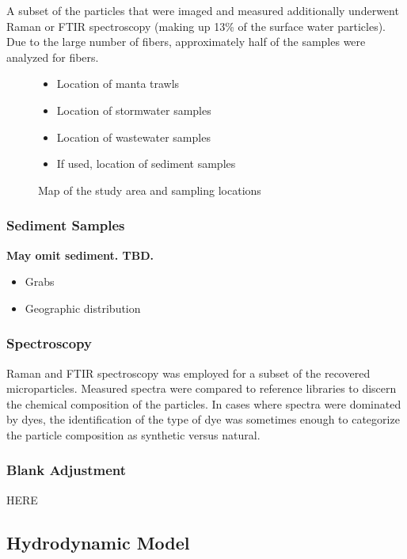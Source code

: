 \documentclass[draft]{jgr/agujournal2019}
\begin{document}
A subset of the particles that were imaged and measured additionally
underwent Raman or FTIR spectroscopy (making up 13\% of the surface
water particles). Due to the large number of fibers, approximately
half of the samples were analyzed for fibers.

\begin{figure}
\begin{itemize}
\item Location of manta trawls
\item Location of stormwater samples
\item Location of wastewater samples
\item If used, location of sediment samples
\end{itemize}
\caption{Map of the study area and sampling locations}
\label{overview_map}
\end{figure}

  
\subsubsection{Sediment Samples}

{\bf May omit sediment.  TBD.}
              
\begin{itemize}
\item Grabs
\item Geographic distribution
\end{itemize}

\subsubsection{Spectroscopy}

Raman and FTIR spectroscopy was employed for a subset of the recovered
microparticles. Measured spectra were compared to reference libraries
to discern the chemical composition of the particles.  In cases where
spectra were dominated by dyes, the identification of the type of dye
was sometimes enough to categorize the particle composition as synthetic
versus natural.

\subsubsection{Blank Adjustment}

HERE

\subsection{Hydrodynamic Model}
\end{document}
